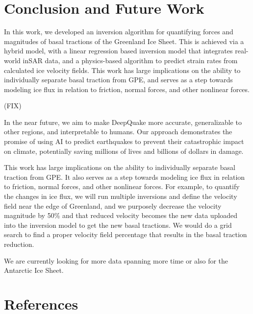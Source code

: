 \documentclass{article}
\begin{document}
\section{Conclusion and Future Work}

In this work, we developed an inversion algorithm for quantifying forces and magnitudes of basal tractions of the Greenland Ice Sheet. This is achieved via a hybrid model, with a linear regression based inversion model that integrates real-world inSAR data, and a physics-based algorithm to predict strain rates from calculated ice velocity fields. This work has large implications on the ability to individually separate basal traction from GPE, and serves as a step towards modeling ice flux in relation to friction, normal forces, and other nonlinear forces.

(FIX)

In the near future, we aim to make DeepQuake more accurate, generalizable to other regions, and interpretable to
humans. Our approach demonstrates the promise of using AI to predict earthquakes to prevent their
catastrophic impact on climate, potentially saving millions of lives and billions of dollars in damage.

\cite{briner_rate_2020}

This work has large implications on the ability to individually separate basal traction from GPE. It also serves as a step towards modeling ice flux in relation to friction, normal forces, and other nonlinear forces. For example, to quantify the changes in ice flux, we will run multiple inversions and define the velocity field near the edge of Greenland, and we purposely decrease the velocity magnitude by 50\% and that reduced velocity becomes the new data uploaded into the inversion model to get the new basal tractions. We would do a grid search to find a proper velocity field percentage that results in the basal traction reduction.

We are currently looking for more data spanning more time or also for the Antarctic Ice Sheet.


\section*{References}

\small

\end{document}

